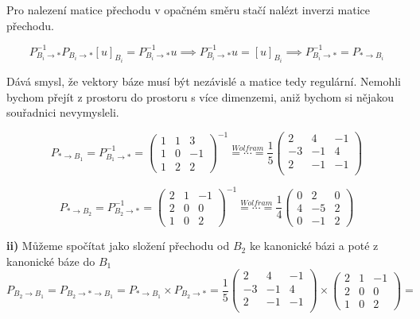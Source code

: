 \documentclass[10pt,a4paper]{article}
\begin{document}
Pro nalezení matice přechodu v opačném směru stačí nalézt inverzi matice přechodu.


\begin{equation*}
P_{ B_i \to *}^{-1}P_{ B_i \to *}[u]_{B_i} = P_{ B_i \to *}^{-1}u \implies P_{B_i \to *}^{-1}u = [u]_{B_i} \implies P_{B_i \to *}^{-1} = P_{* \to B_i }
\end{equation*}

Dává smysl, že vektory báze musí být nezávislé a matice tedy regulární. Nemohli bychom přejít z prostoru do prostoru s více dimenzemi, aniž bychom si nějakou souřadnici nevymysleli.

\begin{equation*}
P_{* \to B_1} = P_{B_1 \to *}^{-1} = 
\begin{pmatrix}
1 & 1 & 3 \\
1 & 0 & -1 \\
1 & 2 & 2 
\end{pmatrix}^{-1}
\overset{Wolfram}{= \cdots =} 
\frac15
\begin{pmatrix}
2 & 4 & -1 \\
-3 & -1 & 4\\
2 & -1 & -1\\
\end{pmatrix}
\end{equation*}


\begin{equation*}
P_{* \to B_2} = P_{B_2 \to *}^{-1} = 
\begin{pmatrix}
2 & 1 & -1 \\
2 & 0 & 0 \\
1 & 0 & 2 
\end{pmatrix}^{-1}
\overset{Wolfram}{= \cdots =}
\frac14
\begin{pmatrix}
0 & 2 & 0 \\
4 & -5 & 2 \\
0 & -1 & 2 
\end{pmatrix}
\end{equation*}

\textbf{ii)} Můžeme spočítat jako složení přechodu od $B_2$ ke kanonické bázi a poté z kanonické báze do $B_1$
\begin{equation*}
P_{B_2 \to B_1} = P_{B_2 \to * \to B_1}= P_{* \to B_1} \times  P_{B_2\to *} =
\frac15
\begin{pmatrix}
2 & 4 & -1 \\
-3 & -1 & 4\\
2 & -1 & -1\\
\end{pmatrix}
\times 
\begin{pmatrix}
2 & 1 & -1 \\
2 & 0 & 0 \\
1 & 0 & 2 
\end{pmatrix} =
\end{equation*}
\end{document}

